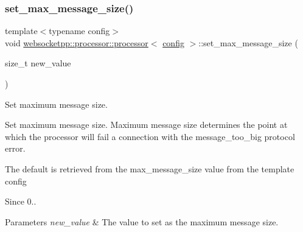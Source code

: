 \mbox{\label{classwebsocketpp_1_1processor_1_1processor_ad412d33b168539dfbfa1d7e89908c5d1}} 
\subsubsection{\texorpdfstring{set\+\_\+max\+\_\+message\+\_\+size()}{set\_max\_message\_size()}}
{\footnotesize\ttfamily template$<$typename config$>$ \\
void \mbox{\hyperlink{classwebsocketpp_1_1processor_1_1processor}{websocketpp\+::processor\+::processor}}$<$ \mbox{\hyperlink{classconfig}{config}} $>$\+::set\+\_\+max\+\_\+message\+\_\+size (\begin{DoxyParamCaption}\item[{size\+\_\+t}]{new\+\_\+value }\end{DoxyParamCaption})\hspace{0.3cm}{\ttfamily [inline]}}



Set maximum message size. 

Set maximum message size. Maximum message size determines the point at which the processor will fail a connection with the message\+\_\+too\+\_\+big protocol error.

The default is retrieved from the max\+\_\+message\+\_\+size value from the template config

\begin{DoxySince}{Since}
0..
\end{DoxySince}

\begin{DoxyParams}{Parameters}
{\em new\+\_\+value} & The value to set as the maximum message size. \\
\hline
\end{DoxyParams}
\mbox{\label{classwebsocketpp_1_1processor_1_1processor_a8828f7d91c534309deb966b783eb1f8e}} 
